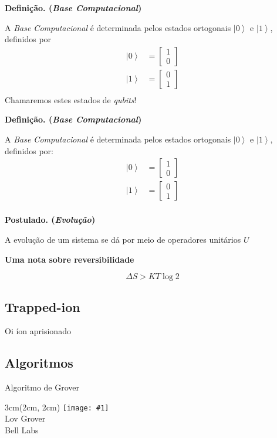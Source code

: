 \documentclass[t]{beamer}
\newcommand{\postulado}[1]{%
	\textbf{Postulado. (\emph{#1})\\}
}
\newcommand{\definicao}[1]{%
	\textbf{Definição. (\emph{#1})\\}
}
\newcommand{\vetor}[2]{\ensuremath{
\left[\begin{matrix}
#1 \\
#2
\end{matrix}\right]
}
}
\newcommand{\ket}[1]{\ensuremath{\left|#1\right\rangle}}
\newcommand{\person}[6]{%
\begin{textblock*}{#4}(#5, #6)
	\texttt{[image: \#1]}\\
	#2\\
	{\small #3}
\end{textblock*}
}
\begin{document}
	\begin{frame}{\subsecname}
		\definicao{Base Computacional}
		A \emph{Base Computacional} é determinada pelos estados ortogonais $\ket{0}$ e $\ket{1}$, definidos por
		\begin{align*}
		\ket{0} &= \vetor{1}{0}\\
		\ket{1} &= \vetor{0}{1}\\
		\end{align*}
		Chamaremos estes estados de \textit{qubits}!
	\end{frame}
	
	
	
	\begin{frame}{\subsecname}
		\definicao{Base Computacional}
		A \emph{Base Computacional} é determinada pelos estados ortogonais $\ket{0}$ e $\ket{1}$, definidos por:
		\begin{align*}
		\ket{0} &= \vetor{1}{0}\\
		\ket{1} &= \vetor{0}{1}\\
		\end{align*}
	\end{frame}
	
	\begin{frame}{\subsecname}
		\postulado{Evolução}
		A evolução de um sistema se dá por meio de operadores unitários $U$
	\end{frame}
	
	\begin{frame}{\subsecname}
		\textbf{Uma nota sobre reversibilidade}
		
		$$\Delta S > K T \log 2$$
	\end{frame}
	
	\subsection{Trapped-ion}
	\begin{frame}{\subsecname}
		Oi íon aprisionado
	\end{frame}

	\subsection{Algoritmos}
	
	\begin{frame}{Algoritmo de Grover}
	
	\person{grover.jpg}{Lov Grover}{Bell Labs}{3cm}{2cm}{2cm}
		
	\end{frame}
\end{document}
